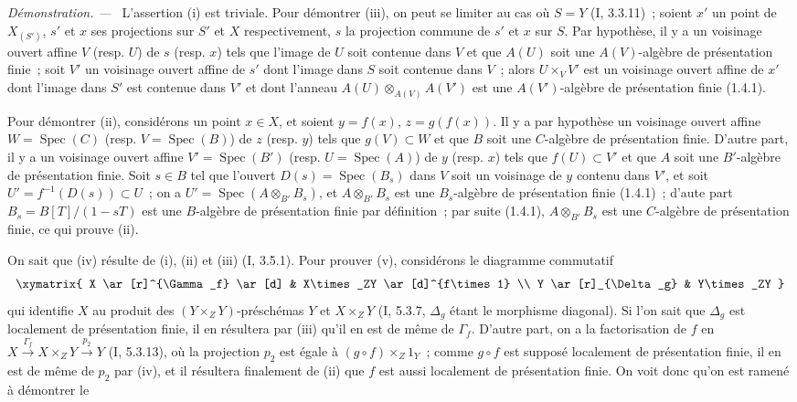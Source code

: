 \documentclass[10pt,oneside]{book}
\newenvironment{proof}{%
  \par\medskip\noindent\textit{Démonstration. ---\ }}{\par}
\begin{document}
\begin{proof}
L'assertion (i) est triviale. Pour démontrer (iii), on peut se limiter au cas
où $S=Y$ (I, 3.3.11)~; soient $x'$ un point de $X_{(S')}$, $s'$ et $x$ ses
projections sur $S'$ et $X$ respectivement, $s$ la projection commune de $s'$
et $x$ sur $S$. Par hypothèse, il y a un voisinage ouvert affine $V$ (resp.
$U$) de $s$ (resp. $x$) tels que l'image de $U$ soit contenue dans $V$ et que
$A(U)$ soit une $A(V)$-algèbre de présentation finie~; soit $V'$ un voisinage
ouvert affine de $s'$ dont l'image dans $S$ soit contenue dans $V$~; alors
$U\times_VV'$ est un voisinage ouvert affine de $x'$ dont l'image dans $S'$
est contenue dans $V'$ et dont l'anneau $A(U)\otimes_{A(V)}A(V')$ est une
$A(V')$-algèbre de présentation finie (1.4.1).

Pour démontrer (ii), considérons un point $x\in X$, et soient $y=f(x)$,
$z=g(f(x))$. Il y a par hypothèse un voisinage ouvert affine $W=\operatorname{Spec}(C)$
(resp. $V=\operatorname{Spec}(B)$) de $z$ (resp. $y$) tels que $g(V)\subset W$ et que $B$
soit une $C$-algèbre de présentation finie. D'autre part, il y a un voisinage
ouvert affine $V'=\operatorname{Spec}(B')$ (resp. $U=\operatorname{Spec}(A)$) de $y$ (resp. $x$) tels que
$f(U)\subset V'$ et que $A$ soit une $B'$-algèbre de présentation finie. Soit
$s\in B$ tel que l'ouvert $D(s)=\operatorname{Spec}(B_s)$ dans $V$ soit un voisinage de $y$
contenu dans $V'$, et soit $U'=f^{-1}(D(s))\subset U$~; on a
$U'=\operatorname{Spec}(A\otimes_{B'}B_s)$, et $A\otimes_{B'}B_s$ est une $B_s$-algèbre de
présentation finie (1.4.1)~; d'aute part $B_s=B[T]/(1-sT)$ est une
$B$-algèbre de présentation finie par définition~; par suite (1.4.1),
$A\otimes_{B'}B_s$ est une $C$-algèbre de présentation finie, ce qui prouve
(ii).

On sait que (iv) résulte de (i), (ii) et (iii) (I, 3.5.1). Pour prouver (v),
considérons le diagramme commutatif
\[
\xymatrix{
X \ar[r]^{\Gamma_f} \ar[d] & X\times_ZY \ar[d]^{f\times 1} \\
Y \ar[r]_{\Delta_g} & Y\times_ZY
}
\]
qui identifie $X$ au produit des $(Y\times_ZY)$-préschémas $Y$ et
$X\times_ZY$ (I, 5.3.7, $\Delta_g$ étant le morphisme diagonal). Si l'on sait
que $\Delta_g$ est localement de présentation finie, il en résultera par
(iii) qu'il en est de même de $\Gamma_f$. D'autre part, on a la factorisation
de $f$ en
$X\xrightarrow{\Gamma_f}X\times_ZY\xrightarrow{p_2}Y$ (I, 5.3.13), où la
projection $p_2$ est égale à $(g\circ f)\times_Z1_Y$~; comme $g\circ f$ est
supposé localement de présentation finie, il en est de même de $p_2$ par
(iv), et il résultera finalement de (ii) que $f$ est aussi localement de
présentation finie. On voit donc qu'on est ramené à démontrer le
\end{proof}
\end{document}
